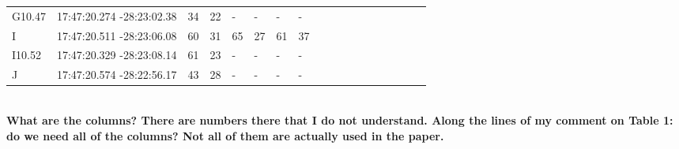 \begin{table}[p]
\begin{minipage}{170mm}
\begin{tabular}{llllllllllllllllll}
G10.47 & 17:47:20.274 -28:23:02.38 & 34 & 22 & - & - & - & - \\
I & 17:47:20.511 -28:23:06.08 & 60 & 31 & 65 & 27 & 61 & 37 \\
I10.52 & 17:47:20.329 -28:23:08.14 & 61 & 23 & - & - & - & - \\
J & 17:47:20.574 -28:22:56.17 & 43 & 28 & - & - & - & - \\
\hline
\end{tabular}\\
{\bf What are the columns? There are numbers there that I do not understand. Along the lines of my comment on Table 1: do we need all of the columns? Not all of them are actually used in the paper.}
\end{minipage}
\end{table}
